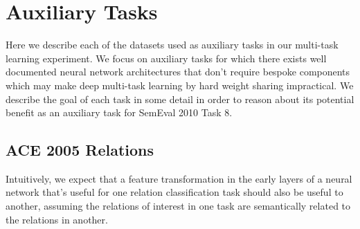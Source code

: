 \section{Auxiliary Tasks}
\label{auxiliary_tasks}
Here we describe each of the datasets used as auxiliary tasks in our multi-task learning experiment. We focus on auxiliary tasks for which there exists well documented neural network architectures that don't require bespoke components which may make deep multi-task learning by hard weight sharing impractical. We describe the goal of each task in some detail in order to reason about its potential benefit as an auxiliary task for SemEval 2010 Task 8.

\subsection{ACE 2005 Relations}
Intuitively, we expect that a feature transformation in the early layers of a neural network that's useful for one relation classification task should also be useful to another, assuming the relations of interest in one task are semantically related to the relations in another.

